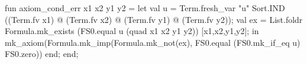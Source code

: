 fun axiom_cond_err x1 x2 y1 y2 =
  let
    val u = Term.fresh_var "u" Sort.IND ((Term.fv x1) @
                                         (Term.fv x2) @
                                         (Term.fv y1) @
                                         (Term.fv y2));
    val ex = List.foldr Formula.mk_exists
                        (FS0.equal u (quad x1 x2 y1 y2))
                        [x1,x2,y1,y2];
  in
    mk_axiom(Formula.mk_imp(Formula.mk_not(ex),
                            FS0.equal (FS0.mk_if_eq u)
                                      FS0.zero))
  end;
end;
\eatline
